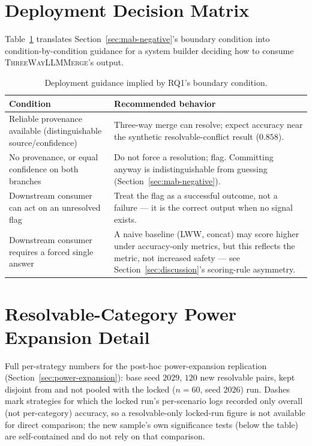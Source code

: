 \documentclass[11pt]{article}
\begin{document}
\section{Deployment Decision Matrix}
\label{sec:decision-matrix}

Table~\ref{tab:decision-matrix} translates Section~\ref{sec:mab-negative}'s
boundary condition into condition-by-condition guidance for a system builder
deciding how to consume \textsc{ThreeWayLLMMerge}'s output.

\begin{table}[t]
  \centering
  \small
  \begin{tabular}{p{}p{}}
    \toprule
    \textbf{Condition} & \textbf{Recommended behavior} \\
    \midrule
    Reliable provenance available (distinguishable source/confidence) &
      Three-way merge can resolve; expect accuracy near the synthetic
      resolvable-conflict result ($0.858$). \\
    \addlinespace
    No provenance, or equal confidence on both branches &
      Do not force a resolution; flag. Committing anyway is indistinguishable
      from guessing (Section~\ref{sec:mab-negative}). \\
    \addlinespace
    Downstream consumer can act on an unresolved flag &
      Treat the flag as a successful outcome, not a failure --- it is the
      correct output when no signal exists. \\
    \addlinespace
    Downstream consumer requires a forced single answer &
      A naive baseline (LWW, concat) may score higher under accuracy-only
      metrics, but this reflects the metric, not increased safety --- see
      Section~\ref{sec:discussion}'s scoring-rule asymmetry. \\
    \bottomrule
  \end{tabular}
  \caption{Deployment guidance implied by RQ1's boundary condition.}
  \label{tab:decision-matrix}
\end{table}

\section{Resolvable-Category Power Expansion Detail}
\label{sec:power-expansion-detail}

Full per-strategy numbers for the post-hoc power-expansion replication
(Section~\ref{sec:power-expansion}): base seed $2029$, $120$ new resolvable
pairs, kept disjoint from and not pooled with the locked ($n{=}60$, seed
$2026$) run. Dashes mark strategies for which the locked run's per-scenario
logs recorded only overall (not per-category) accuracy, so a resolvable-only
locked-run figure is not available for direct comparison; the new sample's
own significance tests (below the table) are self-contained and do not rely
on that comparison.
\end{document}
